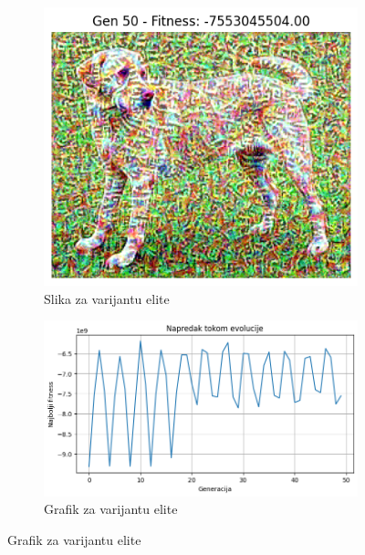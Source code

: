\documentclass[a4paper,12pt]{article}
\begin{document}
\begin{figure}[h]
\centering
\begin{subfigure}{0.4\textwidth}
    \centering
    \includegraphics[width=\linewidth]{elite2.png}
    \caption{Slika za varijantu elite}
\end{subfigure}
\hfill
\begin{subfigure}{0.4\textwidth}
    \centering
    \includegraphics[width=\linewidth]{elite2gr.png}
    \caption{Grafik za varijantu elite}
\end{subfigure}

\vspace{0.1cm} %


\end{figure}
\end{document}
